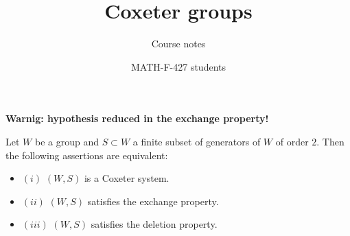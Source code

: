 \documentclass[envcountsame,envcountchap]{svmono}
\begin{document}
\author{MATH-F-427 students}
\title{Coxeter groups}
\subtitle{Course notes}
\maketitle

\frontmatter%

\tableofcontents


\mainmatter%

\textbf{Warnig: hypothesis reduced in the exchange property!}


\begin{theorem} [Matsumoto]
Let $W$ be a group and $S \subset W$ a finite subset of generators of $W$ of order $2$. Then the following assertions are equivalent:
\begin{itemize}
\item $(i)$ $(W, S)$ is a Coxeter system. 
\item $(ii)$ $(W, S)$ satisfies the exchange property.
\item $(iii)$ $(W,S)$ satisfies the deletion property.
\end{itemize}  
\end{theorem}	
\end{document}
